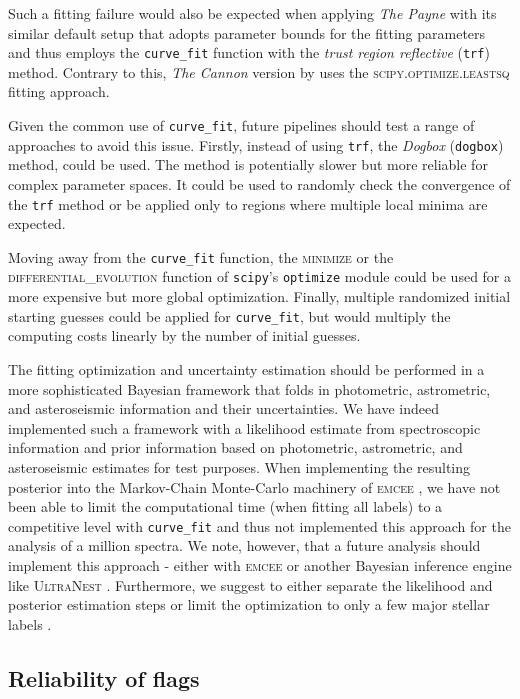 \documentclass[
  journal=pasa,
  manuscript=research-paper, %
  year=2024,
  volume=37
]{cup-journal}
\begin{document}
Such a fitting failure would also be expected when applying \textit{The Payne} \citep{Ting2019} with its similar default setup that adopts parameter bounds for the fitting parameters and thus employs the \texttt{curve\_fit} function with the \textit{trust region reflective} (\texttt{trf}) method. Contrary to this, \textit{The Cannon} version by \citep{Casey2016} uses the \textsc{scipy.optimize.leastsq} fitting approach.

Given the common use of \texttt{curve\_fit}, future pipelines should test a range of approaches to avoid this issue. Firstly, instead of using \texttt{trf}, the \textit{Dogbox} (\texttt{dogbox}) method,  could be used. The method is potentially slower but more reliable for complex parameter spaces. It could be used to randomly check the convergence of the \texttt{trf} method or be applied only to regions where multiple local minima are expected.

Moving away from the \texttt{curve\_fit} function, the \textsc{minimize} or the \textsc{differential\_evolution} function of \texttt{scipy}'s \texttt{optimize} module could be used for a more expensive but more global optimization. Finally, multiple randomized initial starting guesses could be applied for \texttt{curve\_fit}, but would multiply the computing costs linearly by the number of initial guesses.

The fitting optimization and uncertainty estimation should be performed in a more sophisticated Bayesian framework that folds in photometric, astrometric, and asteroseismic information and their uncertainties. We have indeed implemented such a framework with a likelihood estimate from spectroscopic information and prior information based on photometric, astrometric, and asteroseismic estimates for test purposes. When implementing the resulting posterior into the Markov-Chain Monte-Carlo machinery of \textsc{emcee} \citep{ForemanMackey2013}, we have not been able to limit the computational time (when fitting all labels) to a competitive level with \texttt{curve\_fit} and thus not implemented this approach for the analysis of a million spectra. We note, however, that a future analysis should implement this approach - either with \textsc{emcee} or another Bayesian inference engine like \textsc{UltraNest} \citep{Buchner2021}. Furthermore, we suggest to either separate the likelihood and posterior estimation steps \citep[see e.g.][]{Gent2022} or limit the optimization to only a few major stellar labels \citep[see e.g.][]{Traven2020}.

\subsection{Reliability of flags} \label{sec:caveats_flags}
\end{document}
